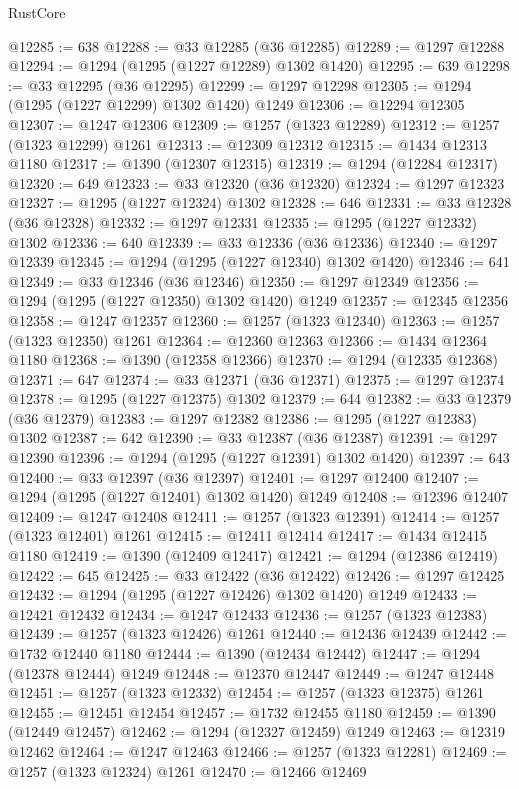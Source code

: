 \begin{lexlean}{RustCore}
\begin{coremodule}
@12285 := 638
@12288 := @33 @12285 (@36 @12285)
@12289 := @1297 @12288
@12294 := @1294 (@1295 (@1227 @12289) @1302 @1420)
@12295 := 639
@12298 := @33 @12295 (@36 @12295)
@12299 := @1297 @12298
@12305 := @1294 (@1295 (@1227 @12299) @1302 @1420) @1249
@12306 := @12294 @12305
@12307 := @1247 @12306
@12309 := @1257 (@1323 @12289)
@12312 := @1257 (@1323 @12299) @1261
@12313 := @12309 @12312
@12315 := @1434 @12313 @1180
@12317 := @1390 (@12307 @12315)
@12319 := @1294 (@12284 @12317)
@12320 := 649
@12323 := @33 @12320 (@36 @12320)
@12324 := @1297 @12323
@12327 := @1295 (@1227 @12324) @1302
@12328 := 646
@12331 := @33 @12328 (@36 @12328)
@12332 := @1297 @12331
@12335 := @1295 (@1227 @12332) @1302
@12336 := 640
@12339 := @33 @12336 (@36 @12336)
@12340 := @1297 @12339
@12345 := @1294 (@1295 (@1227 @12340) @1302 @1420)
@12346 := 641
@12349 := @33 @12346 (@36 @12346)
@12350 := @1297 @12349
@12356 := @1294 (@1295 (@1227 @12350) @1302 @1420) @1249
@12357 := @12345 @12356
@12358 := @1247 @12357
@12360 := @1257 (@1323 @12340)
@12363 := @1257 (@1323 @12350) @1261
@12364 := @12360 @12363
@12366 := @1434 @12364 @1180
@12368 := @1390 (@12358 @12366)
@12370 := @1294 (@12335 @12368)
@12371 := 647
@12374 := @33 @12371 (@36 @12371)
@12375 := @1297 @12374
@12378 := @1295 (@1227 @12375) @1302
@12379 := 644
@12382 := @33 @12379 (@36 @12379)
@12383 := @1297 @12382
@12386 := @1295 (@1227 @12383) @1302
@12387 := 642
@12390 := @33 @12387 (@36 @12387)
@12391 := @1297 @12390
@12396 := @1294 (@1295 (@1227 @12391) @1302 @1420)
@12397 := 643
@12400 := @33 @12397 (@36 @12397)
@12401 := @1297 @12400
@12407 := @1294 (@1295 (@1227 @12401) @1302 @1420) @1249
@12408 := @12396 @12407
@12409 := @1247 @12408
@12411 := @1257 (@1323 @12391)
@12414 := @1257 (@1323 @12401) @1261
@12415 := @12411 @12414
@12417 := @1434 @12415 @1180
@12419 := @1390 (@12409 @12417)
@12421 := @1294 (@12386 @12419)
@12422 := 645
@12425 := @33 @12422 (@36 @12422)
@12426 := @1297 @12425
@12432 := @1294 (@1295 (@1227 @12426) @1302 @1420) @1249
@12433 := @12421 @12432
@12434 := @1247 @12433
@12436 := @1257 (@1323 @12383)
@12439 := @1257 (@1323 @12426) @1261
@12440 := @12436 @12439
@12442 := @1732 @12440 @1180
@12444 := @1390 (@12434 @12442)
@12447 := @1294 (@12378 @12444) @1249
@12448 := @12370 @12447
@12449 := @1247 @12448
@12451 := @1257 (@1323 @12332)
@12454 := @1257 (@1323 @12375) @1261
@12455 := @12451 @12454
@12457 := @1732 @12455 @1180
@12459 := @1390 (@12449 @12457)
@12462 := @1294 (@12327 @12459) @1249
@12463 := @12319 @12462
@12464 := @1247 @12463
@12466 := @1257 (@1323 @12281)
@12469 := @1257 (@1323 @12324) @1261
@12470 := @12466 @12469

\end{coremodule}
\end{lexlean}
